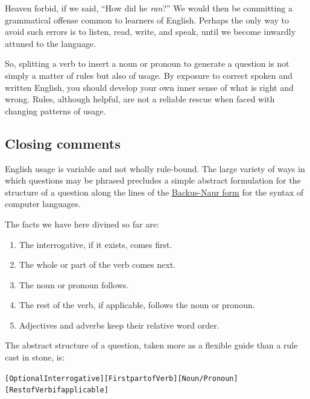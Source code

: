 \documentclass[
  a4paper,
]{article}
\newcommand\noun[1]{\textcolor{noun}{#1}}
\newcommand\pronoun[1]{\textcolor{pronoun}{#1}}
\newcommand\action[1]{\textcolor{action}{#1}}
\begin{document}
Heaven forbid, if we said, ``How did he \emph{ran}?'' We would then be
committing a grammatical offense common to learners of English. Perhaps
the only way to avoid such errors is to listen, read, write, and speak,
until we become inwardly attuned to the language.

So, splitting a verb to insert a noun or pronoun to generate a question
is not simply a matter of rules but also of usage. By exposure to
correct spoken and written English, you should develop your own inner
sense of what is right and wrong. Rules, although helpful, are not a
reliable rescue when faced with changing patterns of usage.

\hypertarget{closing-comments}{%
\subsection{Closing comments}\label{closing-comments}}

English usage is variable and not wholly rule-bound. The large variety
of ways in which questions may be phrased precludes a simple abstract
formulation for the structure of a question along the lines of the
\href{http://en.wikipedia.org/wiki/Backus_Naur_form}{Backus-Naur form}
for the syntax of computer languages.

The facts we have here divined so far are:

\begin{enumerate}
\item
  The interrogative, if it exists, comes first.
\item
  The whole or part of the verb comes next.
\item
  The noun or pronoun follows.
\item
  The rest of the verb, if applicable, follows the noun or pronoun.
\item
  Adjectives and adverbs keep their relative word order.
\end{enumerate}

The abstract structure of a question, taken more as a flexible guide
than a rule cast in stone, is:

\begin{tcolorbox}
\begin{alltt}
\color{normal}
[Optional Interrogative] [\action{First part of Verb}] [\noun{Noun}/\pronoun{Pronoun}] [\action{Rest of \newline Verb if applicable}]
\end{alltt}
\end{tcolorbox}
\end{document}
